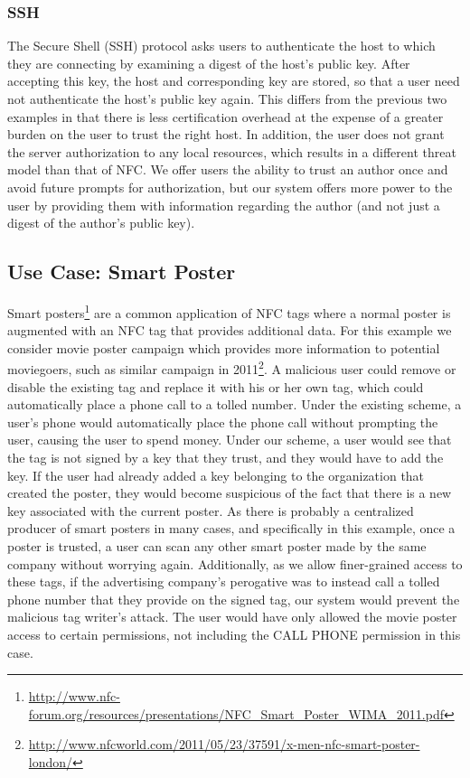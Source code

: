 \documentclass[12pt]{article}
\begin{document}
\subsubsection{SSH}
The Secure Shell (SSH) protocol asks users to authenticate the host to which they are connecting by examining a digest of the host's public key.
After accepting this key, the host and corresponding key are stored, so that a user need not authenticate the host's public key again.
This differs from the previous two examples in that there is less certification overhead at the expense of a greater burden on the user to trust the right host.
In addition, the user does not grant the server authorization to any local resources, which results in a different threat model than that of NFC.
We offer users the ability to trust an author once and avoid future prompts for authorization, but our system offers more power to the user by providing them with information regarding the author (and not just a digest of the author's public key).

\subsection{Use Case: Smart Poster}
Smart posters\footnote{\url{http://www.nfc-forum.org/resources/presentations/NFC_Smart_Poster_WIMA_2011.pdf}} are a common application of NFC tags where a normal poster is augmented with an NFC tag that provides additional data.
For this example we consider movie poster campaign which provides more information to potential moviegoers, such as similar campaign in 2011\footnote{\url{http://www.nfcworld.com/2011/05/23/37591/x-men-nfc-smart-poster-london/}}.
A malicious user could remove or disable the existing tag and replace it with his or her own tag, which could automatically place a phone call to a tolled number.
Under the existing scheme, a user's phone would automatically place the phone call without prompting the user, causing the user to spend money.
Under our scheme, a user would see that the tag is not signed by a key that they trust, and they would have to add the key.
If the user had already added a key belonging to the organization that created the poster, they would become suspicious of the fact that there is a new key associated with the current poster.
As there is probably a centralized producer of smart posters in many cases, and specifically in this example, once a poster is trusted, a user can scan any other smart poster made by the same company without worrying again. 
Additionally, as we allow finer-grained access to these tags, if the advertising company's perogative was to instead call a tolled phone number that they provide on the signed tag, our system would prevent the malicious tag writer's attack. The user would have only allowed the movie poster access to certain permissions, not including the CALL PHONE permission in this case.  
\end{document}
